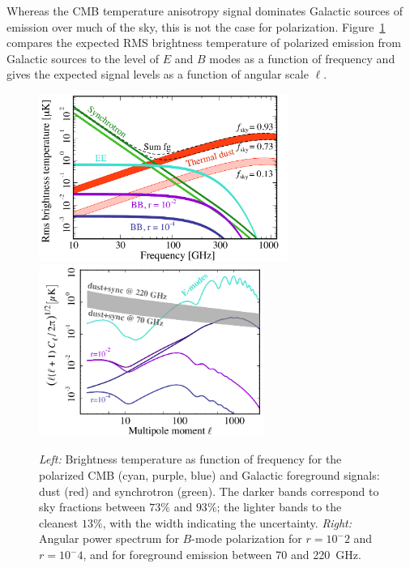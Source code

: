 Whereas the CMB temperature anisotropy signal dominates Galactic sources
of emission over much of the sky, this is not the case for polarization. 
Figure~\ref{fig:frequency} compares the expected RMS brightness temperature 
of polarized emission from Galactic sources to the level of $E$ and $B$ modes
as a function of frequency and gives the expected signal levels as a function of angular scale $\ell$.  
\begin{figure}[ht!]
\hspace{-0.2in}
\begin{center}
\includegraphics[width=3.2in]{Figures/overview_pol_v4_fsky_noplanck.pdf}
\includegraphics[width=2.9in]{Figures/cmb_vs_foreground.pdf}
\end{center}
\vspace{-0.25in}
\caption{\small \setlength{\baselineskip}{0.95\baselineskip}
{\it Left:} Brightness temperature as function of frequency for the polarized CMB (cyan, purple, blue)
and Galactic foreground signals: dust (red) and synchrotron (green). The darker bands correspond to
sky fractions between $73\%$ and $93\%$; the lighter bands to the cleanest $13\%$, with the width 
indicating the uncertainty. {\it Right:} Angular power spectrum for $B$-mode polarization for $r=10^-2$ and $r=10^-4$, and for foreground emission between 70 and 220~GHz.}
\label{fig:frequency}
\vspace{-0.05in}
\end{figure}

